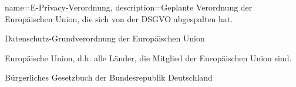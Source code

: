 {
    name={E-Privacy-Verordnung},
    description={Geplante Verordnung der Europäischen Union, die sich von der DSGVO abgespalten hat.}
}

{
    Datenschutz-Grundverordnung der Europäischen Union
}

{  
    Europäische Union, d.h. alle Länder, die Mitglied der Europäischen Union sind.
}

{
    Bürgerliches Gesetzbuch der Bundesrepublik Deutschland
}